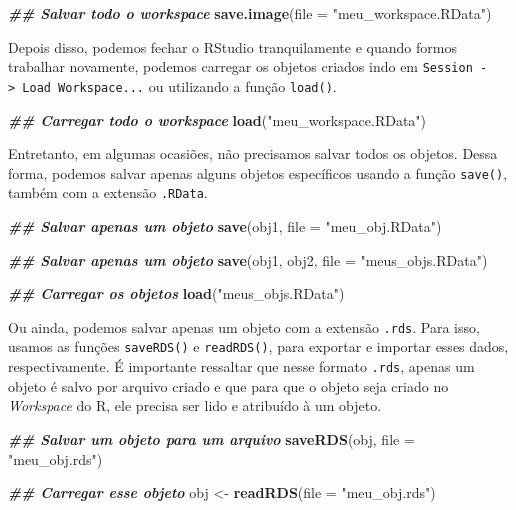 \documentclass[
]{article}
\newenvironment{Shaded}{\begin{snugshade}}{\end{snugshade}}
\newcommand{\AttributeTok}[1]{\textcolor[rgb]{0.13,0.29,0.53}{#1}}
\newcommand{\DocumentationTok}[1]{\textcolor[rgb]{0.56,0.35,0.01}{\textbf{\textit{#1}}}}
\newcommand{\FunctionTok}[1]{\textcolor[rgb]{0.13,0.29,0.53}{\textbf{#1}}}
\newcommand{\NormalTok}[1]{#1}
\newcommand{\OtherTok}[1]{\textcolor[rgb]{0.56,0.35,0.01}{#1}}
\newcommand{\StringTok}[1]{\textcolor[rgb]{0.31,0.60,0.02}{#1}}
\begin{document}
\begin{Shaded}
\begin{Highlighting}[]
\DocumentationTok{\#\# Salvar todo o workspace}
\FunctionTok{save.image}\NormalTok{(}\AttributeTok{file =} \StringTok{"meu\_workspace.RData"}\NormalTok{)}
\end{Highlighting}
\end{Shaded}

Depois disso, podemos fechar o RStudio tranquilamente e quando formos trabalhar novamente, podemos carregar os objetos criados indo em \texttt{Session\ -\textgreater{}\ Load\ Workspace...} ou utilizando a função \texttt{load()}.

\begin{Shaded}
\begin{Highlighting}[]
\DocumentationTok{\#\# Carregar todo o workspace}
\FunctionTok{load}\NormalTok{(}\StringTok{"meu\_workspace.RData"}\NormalTok{)}
\end{Highlighting}
\end{Shaded}

Entretanto, em algumas ocasiões, não precisamos salvar todos os objetos. Dessa forma, podemos salvar apenas alguns objetos específicos usando a função \texttt{save()}, também com a extensão \texttt{.RData}.

\begin{Shaded}
\begin{Highlighting}[]
\DocumentationTok{\#\# Salvar apenas um objeto}
\FunctionTok{save}\NormalTok{(obj1, }\AttributeTok{file =} \StringTok{"meu\_obj.RData"}\NormalTok{)}

\DocumentationTok{\#\# Salvar apenas um objeto}
\FunctionTok{save}\NormalTok{(obj1, obj2, }\AttributeTok{file =} \StringTok{"meus\_objs.RData"}\NormalTok{)}

\DocumentationTok{\#\# Carregar os objetos}
\FunctionTok{load}\NormalTok{(}\StringTok{"meus\_objs.RData"}\NormalTok{)}
\end{Highlighting}
\end{Shaded}

Ou ainda, podemos salvar apenas um objeto com a extensão \texttt{.rds}. Para isso, usamos as funções \texttt{saveRDS()} e \texttt{readRDS()}, para exportar e importar esses dados, respectivamente. É importante ressaltar que nesse formato \texttt{.rds}, apenas um objeto é salvo por arquivo criado e que para que o objeto seja criado no \emph{Workspace} do R, ele precisa ser lido e atribuído à um objeto.

\begin{Shaded}
\begin{Highlighting}[]
\DocumentationTok{\#\# Salvar um objeto para um arquivo}
\FunctionTok{saveRDS}\NormalTok{(obj, }\AttributeTok{file =} \StringTok{"meu\_obj.rds"}\NormalTok{)}

\DocumentationTok{\#\# Carregar esse objeto}
\NormalTok{obj }\OtherTok{\textless{}{-}} \FunctionTok{readRDS}\NormalTok{(}\AttributeTok{file =} \StringTok{"meu\_obj.rds"}\NormalTok{)}
\end{Highlighting}
\end{Shaded}
\end{document}
